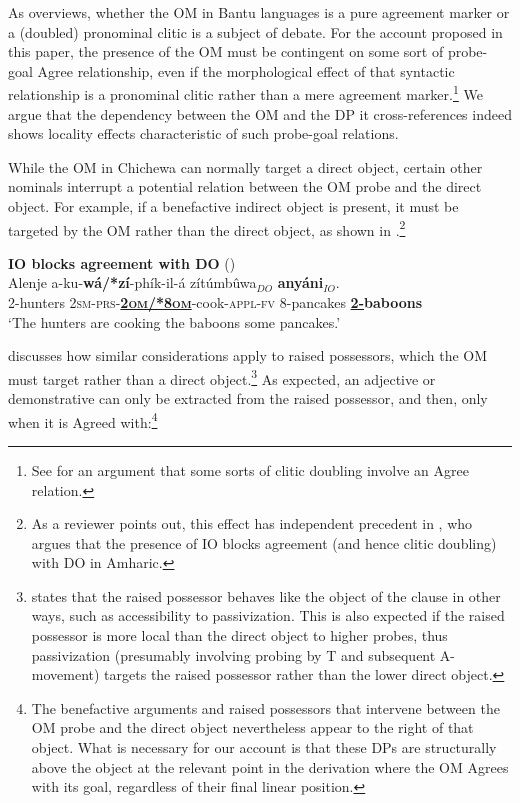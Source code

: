 \documentclass[output=paper,colorlinks,citecolor=brown]{langscibook}
\begin{document}
As \citet{Baker2016} overviews, whether the OM in Bantu languages is a pure agreement marker or a (doubled) pronominal clitic is a subject of debate. For the account proposed in this paper, the presence of the OM must be contingent on some sort of probe-goal Agree relationship, even if the morphological effect of that syntactic relationship is a pronominal clitic rather than a mere agreement marker.\footnote{See \citet{Preminger2015} for an argument that some sorts of clitic doubling involve an Agree relation.} We argue that the dependency between the OM and the DP it cross-references indeed shows locality effects characteristic of such probe-goal relations.

While the OM in Chichewa can normally target a direct object, certain other nominals interrupt a potential relation between the OM probe and the direct object. For example, if a benefactive indirect object is present, it must be targeted by the OM rather than the direct object, as shown in .\footnote{As a reviewer points out, this effect has independent precedent in \citet{Kramer2014}, who argues that the presence of IO blocks agreement (and hence clitic doubling) with DO in Amharic.}

\ea%
    \label{ex:branan:11}
    \textbf{IO blocks agreement with DO} \hfill{(\citealt[101, ex. 41a-b]{Mchombo2004})}\\
    \gll    Alenje a-ku-\textbf{wá/*zí}-phík-il-á zítúmbûwa$_{DO}$  \textbf{anyáni}$_{IO}$. \\
            2-hunters 2\textsc{sm-prs}-\underline{\textbf{\textsc{2om/*8om}}}-cook-\textsc{appl-fv} 8-pancakes \textbf{\underline{2-}baboons}  \\
    \glt    `The hunters are cooking the baboons some pancakes.'
\z

\citet{Mchombo2004} discusses how similar considerations apply to raised possessors, which the OM must target rather than a direct object.\footnote{\citeauthor{Mchombo2004} states that the raised possessor behaves like the object of the clause in other ways, such as accessibility to passivization. This is also expected if the raised possessor is more local than the direct object to higher probes, thus passivization (presumably involving probing by T and subsequent A-movement) targets the raised possessor rather than the lower direct object.} As expected, an adjective or demonstrative can only be extracted from the raised possessor, and then, only when it is Agreed with:\footnote{The benefactive arguments and raised possessors that intervene between the OM probe and the direct object nevertheless appear to the right of that object. What is necessary for our account is that these DPs are structurally above the object at the relevant point in the derivation where the OM Agrees with its goal, regardless of their final linear position.}
\end{document}
